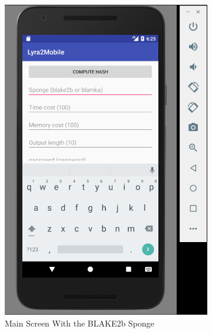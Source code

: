 \begin{figure}[H]
\centering
\begin{subfigure}{.5\textwidth}
  \centering
  \includegraphics[width=.8\linewidth]{figures/lyra2-mobile-main-clean}
  \caption{Main Screen With the BLAKE2b Sponge}
  \label{fig:lyra2-mobile-main-blake2b}
\end{subfigure}%
\begin{subfigure}{.5\textwidth}
  \centering

\end{subfigure}
\end{figure}
